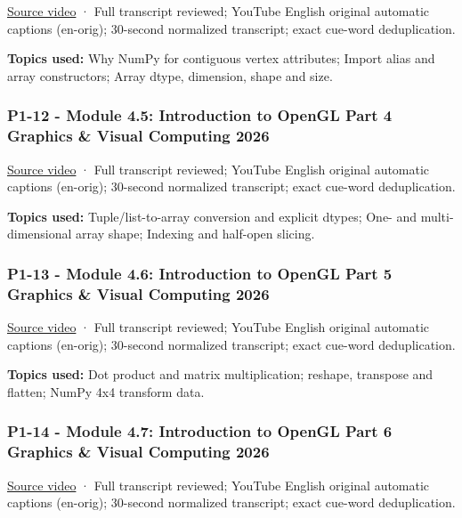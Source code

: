 \href{https://www.youtube.com/watch?v=sr-4ZAnBXIM}{Source video} · Full transcript reviewed; YouTube English original automatic captions (en-orig); 30-second normalized transcript; exact cue-word deduplication.

\textbf{Topics used:} Why NumPy for contiguous vertex attributes; Import alias and array constructors; Array dtype, dimension, shape and size.

\subsubsection{P1-12 - Module 4.5: Introduction to OpenGL Part 4 Graphics \& Visual Computing 2026}\label{04-visual-computing-ii-ch036-p1-12---module-4.5-introduction-to-opengl-part-4-graphics-visual-computing-2026}

\href{https://www.youtube.com/watch?v=Eu4pGvCAOhI}{Source video} · Full transcript reviewed; YouTube English original automatic captions (en-orig); 30-second normalized transcript; exact cue-word deduplication.

\textbf{Topics used:} Tuple/list-to-array conversion and explicit dtypes; One- and multi-dimensional array shape; Indexing and half-open slicing.

\subsubsection{P1-13 - Module 4.6: Introduction to OpenGL Part 5 Graphics \& Visual Computing 2026}\label{04-visual-computing-ii-ch036-p1-13---module-4.6-introduction-to-opengl-part-5-graphics-visual-computing-2026}

\href{https://www.youtube.com/watch?v=e2GQBMBWyh0}{Source video} · Full transcript reviewed; YouTube English original automatic captions (en-orig); 30-second normalized transcript; exact cue-word deduplication.

\textbf{Topics used:} Dot product and matrix multiplication; reshape, transpose and flatten; NumPy 4x4 transform data.

\subsubsection{P1-14 - Module 4.7: Introduction to OpenGL Part 6 Graphics \& Visual Computing 2026}\label{04-visual-computing-ii-ch036-p1-14---module-4.7-introduction-to-opengl-part-6-graphics-visual-computing-2026}

\href{https://www.youtube.com/watch?v=EtgZoNuFZiw}{Source video} · Full transcript reviewed; YouTube English original automatic captions (en-orig); 30-second normalized transcript; exact cue-word deduplication.

